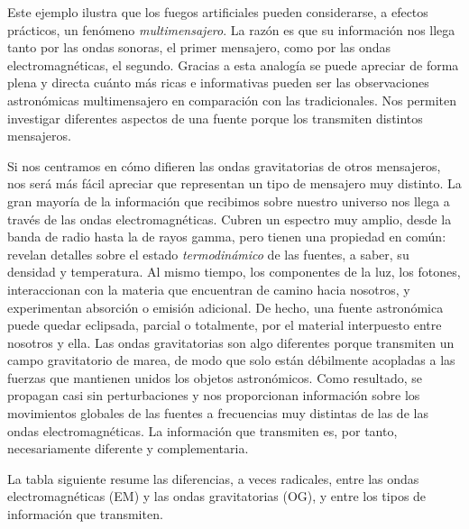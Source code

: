 Este ejemplo ilustra que los fuegos artificiales pueden considerarse, a efectos prácticos, un fenómeno \emph{multimensajero}. La razón es que su información nos llega tanto por las ondas sonoras, el primer mensajero, como por las ondas electromagnéticas, el segundo. Gracias a esta analogía se puede apreciar de forma plena y directa cuánto más ricas e informativas pueden ser las observaciones astronómicas multimensajero en comparación con las tradicionales. Nos permiten investigar diferentes aspectos de una fuente porque los transmiten distintos mensajeros.

Si nos centramos en cómo difieren las ondas gravitatorias de otros mensajeros, nos será más fácil apreciar que representan un tipo de mensajero muy distinto. La gran mayoría de la información que recibimos sobre nuestro universo nos llega a través de las ondas electromagnéticas. Cubren un espectro muy amplio, desde la banda de radio hasta la de rayos gamma, pero tienen una propiedad en común: revelan detalles sobre el estado \emph{termodinámico} de las fuentes, a saber, su densidad y temperatura. Al mismo tiempo, los componentes de la luz, los fotones, interaccionan con la materia que encuentran de camino hacia nosotros, y experimentan absorción o emisión adicional. De hecho, una fuente astronómica puede quedar eclipsada, parcial o totalmente, por el material interpuesto entre nosotros y ella. Las ondas gravitatorias son algo diferentes porque transmiten un campo gravitatorio de marea, de modo que solo están débilmente acopladas a las fuerzas que mantienen unidos los objetos astronómicos. Como resultado, se propagan casi sin perturbaciones y nos proporcionan información sobre los movimientos globales de las fuentes a frecuencias muy distintas de las de las ondas electromagnéticas. La información que transmiten es, por tanto, necesariamente diferente y complementaria.

La tabla siguiente resume las diferencias, a veces radicales, entre las ondas electromagnéticas (EM) y las ondas gravitatorias (OG), y entre los tipos de información que transmiten.



